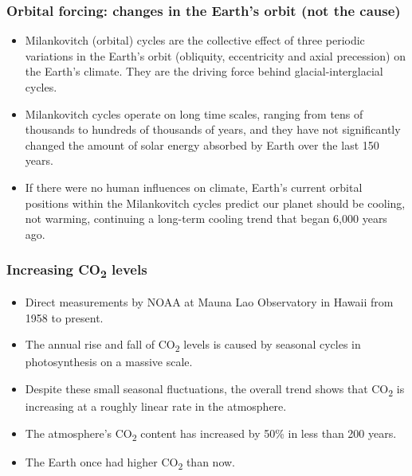 \documentclass[11pt]{article}
\begin{document}
\subsubsection{Orbital forcing: changes in the Earth's orbit (not the cause)}
\label{sec:org71dd168}
\begin{itemize}
\item Milankovitch (orbital) cycles are the collective effect of three periodic variations in the Earth's orbit (obliquity, eccentricity and axial precession) on the Earth's climate. They are the driving force behind glacial-interglacial cycles.
\item Milankovitch cycles operate on long time scales, ranging from tens of thousands to hundreds of thousands of years, and they have not significantly changed the amount of solar energy absorbed by Earth over the last 150 years.
\item If there were no human influences on climate, Earth's current orbital positions within the Milankovitch cycles predict our planet should be cooling, not warming, continuing a long-term cooling trend that began 6,000 years ago.
\end{itemize}

\subsubsection{Increasing CO\textsubscript{2} levels}
\label{sec:org5647660}
\begin{itemize}
\item Direct measurements by NOAA at Mauna Lao Observatory in Hawaii from 1958 to present.
\item The annual rise and fall of CO\textsubscript{2} levels is caused by seasonal cycles in photosynthesis on a massive scale.
\item Despite these small seasonal fluctuations, the overall trend shows that CO\textsubscript{2} is increasing at a roughly linear rate in the atmosphere.
\item The atmosphere's CO\textsubscript{2} content has increased by 50\% in less than 200 years.
\item The Earth once had higher CO\textsubscript{2} than now.
\end{itemize}
\end{document}
